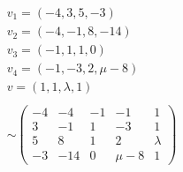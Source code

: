 \documentclass{article}
\begin{document}
    \begin{align*}
        v_1 = (-4, 3, 5, -3)\\
        v_2 = (-4, -1, 8, -14)\\
        v_3 = (-1, 1, 1, 0)\\
        v_4 = (-1, -3, 2,\mu - 8)\\
        v   = (1, 1, \lambda, 1)\\
        \\
        \sim
        \begin{pmatrix}
             -4 & -4 & -1 & -1 & 1\\
             3 & -1 & 1 & -3 & 1\\
             5 & 8 & 1 & 2 & \lambda\\
             -3 & -14 & 0 & \mu - 8 & 1
        \end{pmatrix}\\
    \end{align*}
\end{document}
